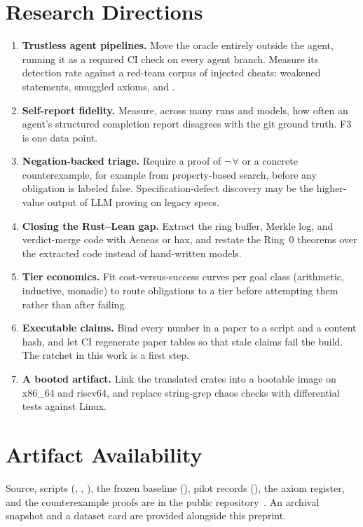 \documentclass[sigconf,nonacm]{acmart}
\begin{document}
\section{Research Directions}\label{sec:directions}
\begin{enumerate}
\item \textbf{Trustless agent pipelines.} Move the oracle entirely outside the agent, running it as a required CI check on every agent branch. Measure its detection rate against a red-team corpus of injected cheats: weakened statements, smuggled axioms, and .
\item \textbf{Self-report fidelity.} Measure, across many runs and models, how often an agent's structured completion report disagrees with the git ground truth. F3 is one data point.
\item \textbf{Negation-backed triage.} Require a proof of $\neg\,\forall$ or a concrete counterexample, for example from property-based search, before any obligation is labeled false. Specification-defect discovery may be the higher-value output of LLM proving on legacy specs.
\item \textbf{Closing the Rust--Lean gap.} Extract the ring buffer, Merkle log, and verdict-merge code with Aeneas or hax, and restate the Ring~0 theorems over the extracted code instead of hand-written models.
\item \textbf{Tier economics.} Fit cost-versus-success curves per goal class (arithmetic, inductive, monadic) to route obligations to a tier before attempting them rather than after failing.
\item \textbf{Executable claims.} Bind every number in a paper to a script and a content hash, and let CI regenerate paper tables so that stale claims fail the build. The ratchet in this work is a first step.
\item \textbf{A booted artifact.} Link the translated crates into a bootable image on x86\_64 and riscv64, and replace string-grep chaos checks with differential tests against Linux.
\end{enumerate}

\section{Artifact Availability}
Source, scripts (, , ), the frozen baseline (), pilot records (), the axiom register, and the counterexample proofs are in the public repository~\cite{RunuXRepo}. An archival snapshot and a dataset card are provided alongside this preprint.
\end{document}
